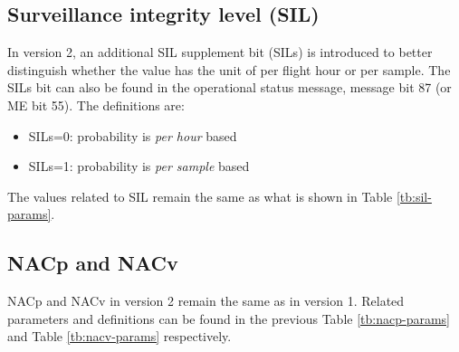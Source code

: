 \subsection{Surveillance integrity level (SIL)}

In version 2, an additional SIL supplement bit (SILs) is introduced to better distinguish whether the value has the unit of per flight hour or per sample. The SILs bit can also be found in the operational status message, message bit 87 (or ME bit 55). The definitions are:

\begin{itemize}
  \item SILs=0: probability is \emph{per hour} based
  \item SILs=1: probability is \emph{per sample} based
\end{itemize}


The values related to SIL remain the same as what is shown in Table \ref{tb:sil-params}.

\subsection{NACp and NACv}

NACp and NACv in version 2 remain the same as in version 1. Related parameters and definitions can be found in the previous Table \ref{tb:nacp-params} and Table \ref{tb:nacv-params} respectively.


